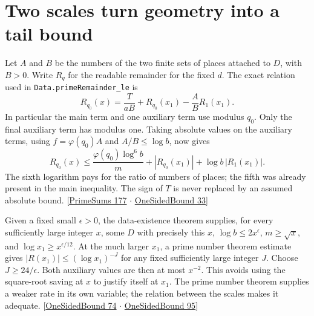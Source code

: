 \documentclass[12pt,letterpaper]{article}
\newcommand{\id}[1]{{\small\nolinkurl{#1}}}
\begin{document}
\section{Two scales turn geometry into a tail bound}
Let $A$ and $B$ be the numbers of the two finite sets of places attached to $D$, with $B>0$. Write $R_q$ for the readable remainder for the fixed $d$. The exact relation used in \id{Data.primeRemainder_le} is
\[
 R_{q_0}(x)=\frac{T}{aB}+R_{q_0}(x_1)-\frac AB R_1(x_1).
\]
In particular the main term and one auxiliary term use modulus $q_0$. Only the final auxiliary term has modulus one. Taking absolute values on the auxiliary terms, using $f=\varphi(q_0)A$ and $A/B\le\log b$, now gives
\[
 R_{q_0}(x)\le \frac{\varphi(q_0)\log^6 b}{m}
          +|R_{q_0}(x_1)|+\log b\,|R_1(x_1)|.
\]
The sixth logarithm pays for the ratio of numbers of places; the fifth was already present in the main inequality. The sign of $T$ is never replaced by an assumed absolute bound. {\small\sffamily\color{mute}[\href{https://github.com/leanprover-community/riemann-hypothesis/blob/e063a923620ee7787b4a1270421478645bf66bdb/src/New/Reduction/PrimeSums.lean#L177}{PrimeSums 177} $\cdot$ \href{https://github.com/leanprover-community/riemann-hypothesis/blob/e063a923620ee7787b4a1270421478645bf66bdb/src/New/Reduction/OneSidedBound.lean#L33}{OneSidedBound 33}]}

Given a fixed small $\epsilon>0$, the data-existence theorem supplies, for every sufficiently large integer $x$, some $D$ with precisely this $x$, $\log b\le2x^\epsilon$, $m\ge\sqrt{x}$, and $\log x_1\ge x^{\epsilon/12}$. At the much larger $x_1$, a prime number theorem estimate gives $|R(x_1)|\le(\log x_1)^{-J}$ for any fixed sufficiently large integer $J$. Choose $J\ge24/\epsilon$. Both auxiliary values are then at most $x^{-2}$. This avoids using the square-root saving at $x$ to justify itself at $x_1$. The prime number theorem supplies a weaker rate in its own variable; the relation between the scales makes it adequate. {\small\sffamily\color{mute}[\href{https://github.com/leanprover-community/riemann-hypothesis/blob/e063a923620ee7787b4a1270421478645bf66bdb/src/New/Reduction/OneSidedBound.lean#L74}{OneSidedBound 74} $\cdot$ \href{https://github.com/leanprover-community/riemann-hypothesis/blob/e063a923620ee7787b4a1270421478645bf66bdb/src/New/Reduction/OneSidedBound.lean#L95}{OneSidedBound 95}]}
\end{document}
